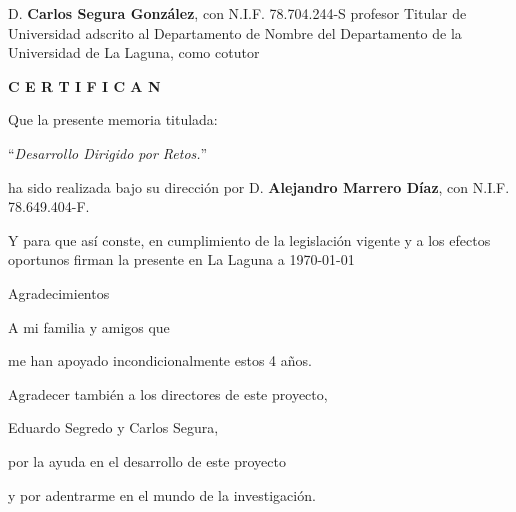 \documentclass[spanish,a4paper,14pt,oneside]{extreport}
\begin{document}
\bigskip
D. {\bf Carlos Segura González}, con N.I.F. 78.704.244-S
profesor
Titular de Universidad
adscrito al Departamento
de Nombre del Departamento
de la Universidad de La Laguna, como cotutor

\bigskip
\bigskip
{\bf C E R T I F I C A N}

\bigskip
\bigskip
\bigskip
Que la presente memoria titulada:

\bigskip
``{\it Desarrollo Dirigido por Retos.}''

\bigskip
\bigskip
\bigskip

\noindent ha sido realizada bajo su dirección por D. {\bf Alejandro Marrero Díaz},
con N.I.F. 78.649.404-F.

\bigskip
\bigskip

Y para que así conste, en cumplimiento de la legislación vigente y a los efectos
oportunos firman la presente en La Laguna a \today

\newpage
\thispagestyle{empty}

{ \flushright

\begin{LARGE}
Agradecimientos
\end{LARGE}

\hspace{3mm}

\begin{large}


\hspace{3mm}
A mi familia y amigos que

\hspace{3mm}
me han apoyado incondicionalmente estos 4 años.

\bigskip

\hspace{3mm}
Agradecer también a los directores de este proyecto,

\hspace{3mm}
Eduardo Segredo y Carlos Segura,

\hspace{3mm}
por la ayuda en el desarrollo de este proyecto

\hspace{3mm}
y por adentrarme en el mundo de la investigación.

\end{large}

}

\newpage
\end{document}
